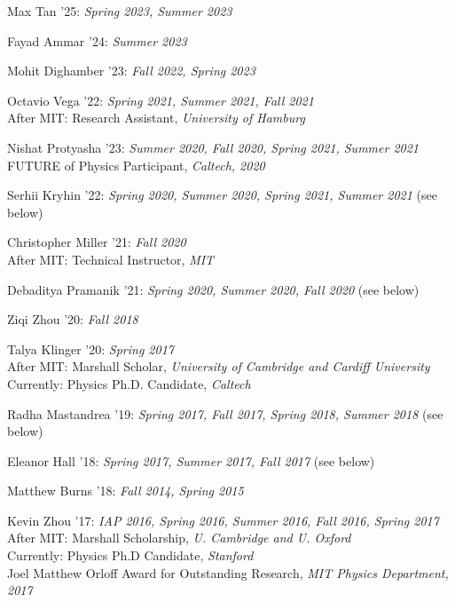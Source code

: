 \bbl

\item Max Tan '25: \emph{Spring 2023, Summer 2023}

\item Fayad Ammar '24: \emph{Summer 2023}

\item Mohit Dighamber '23: \emph{Fall 2022, Spring 2023}

\item Octavio Vega '22: \emph{Spring 2021, Summer 2021, Fall 2021}
\\ \sh After MIT: Research Assistant, \emph{University of Hamburg}

\item Nishat Protyasha '23: \emph{Summer 2020, Fall 2020, Spring 2021, Summer 2021}
\\ \sh FUTURE of Physics Participant, \emph{Caltech, 2020}

\item Serhii Kryhin '22: \emph{Spring 2020, Summer 2020, Spring 2021, Summer 2021} (see below) 

\item Christopher Miller '21: \emph{Fall 2020}
\\ \sh After MIT: Technical Instructor, \emph{MIT}

\item Debaditya Pramanik '21: \emph{Spring 2020, Summer 2020, Fall 2020} (see below) 

\item Ziqi Zhou '20: \emph{Fall 2018}

\item Talya Klinger '20: \emph{Spring 2017}
\\ \sh After MIT: Marshall Scholar, \emph{University of Cambridge and Cardiff University}
\\ \sh Currently: Physics Ph.D. Candidate, \emph{Caltech}

\item Radha Mastandrea '19: \emph{Spring 2017, Fall 2017, Spring 2018, Summer 2018} (see below) 

\item Eleanor Hall '18: \emph{Spring 2017, Summer 2017, Fall 2017} (see below) 

\item Matthew Burns '18: \emph{Fall 2014, Spring 2015}

\item Kevin Zhou '17: \emph{IAP 2016, Spring 2016, Summer 2016, Fall 2016, Spring 2017}
\\ \sh After MIT: Marshall Scholarship, \emph{U. Cambridge and U. Oxford}
\\ \sh Currently: Physics Ph.D Candidate, \emph{Stanford}
\\ \sh Joel Matthew Orloff Award for Outstanding Research, \emph{MIT Physics Department, 2017}

